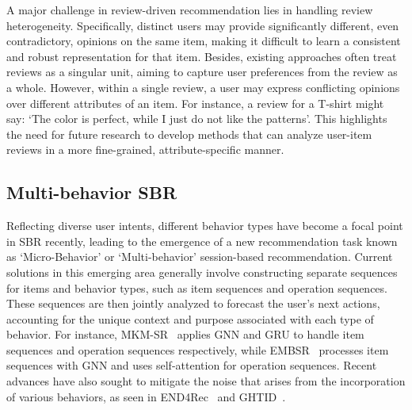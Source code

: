 \documentclass[lettersize,journal]{IEEEtran}
\begin{document}
A major challenge in review-driven recommendation lies in handling review heterogeneity. Specifically, distinct users may provide significantly different, even contradictory, opinions on the same item, making it difficult to learn a consistent and robust representation for that item. Besides, existing approaches often treat reviews as a singular unit, aiming to capture user preferences from the review as a whole. However, within a single review, a user may express conflicting opinions over different attributes of an item. For instance, a review for a T-shirt might say: `The color is perfect, while I just do not like the patterns'. This highlights the need for future research to develop methods that can analyze user-item reviews in a more fine-grained, attribute-specific manner. 


\subsection{Multi-behavior SBR}\label{behaviorsbr}
Reflecting diverse user intents, different behavior types have become a focal point in SBR recently, leading to the emergence of a new recommendation task known as `Micro-Behavior' or `Multi-behavior' session-based recommendation. Current solutions in this emerging area generally involve constructing separate sequences for items and behavior types, such as item sequences and operation sequences. These sequences are then jointly analyzed to forecast the user's next actions, accounting for the unique context and purpose associated with each type of behavior. For instance, MKM-SR~\cite{meng@SIGIR2020} applies GNN and GRU to handle item sequences and operation sequences respectively, while EMBSR~\cite{Yuan@ICDE2022} processes item sequences with GNN and uses self-attention for operation sequences. Recent advances have also sought to mitigate the noise that arises from the incorporation of various behaviors, as seen in END4Rec~\cite{Han@WWW2024} and GHTID~\cite{Li@WSDM2024}. 
\end{document}

